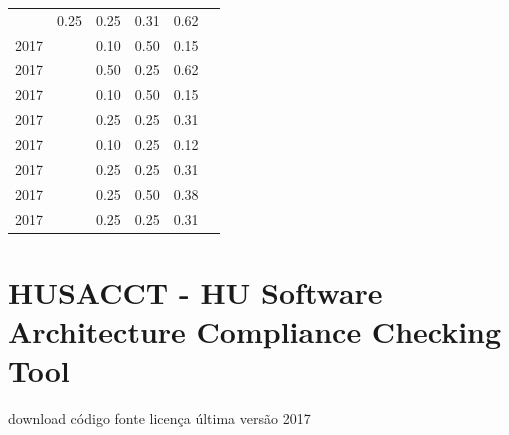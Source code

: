 \begin{table}[H]
\begin{tabular}{| l | c | c | c | c | c |}
          &
          0.25
          &
          0.25
          &
          0.31
          &
            {\color{blue} 0.62}
          \\
            2017
          &
          
          &
          0.10
          &
          0.50
          &
          0.15
          &
          \\
            2017
          &
          
          &
          0.50
          &
          0.25
          &
          0.62
          &
          \\
            2017
          &
          
          &
          0.10
          &
          0.50
          &
          0.15
          &
          \\
            2017
          &
          
          &
          0.25
          &
          0.25
          &
          0.31
          &
          \\
            2017
          &
          
          &
          0.10
          &
          0.25
          &
          0.12
          &
          \\
            2017
          &
          
          &
          0.25
          &
          0.25
          &
          0.31
          &
          \\
            2017
          &
          
          &
          0.25
          &
          0.50
          &
          0.38
          &
          \\
            2017
          &
          
          &
          0.25
          &
          0.25
          &
          0.31
          &
          \\
\hline
\end{tabular}
\end{table}



\section{HUSACCT - HU Software Architecture Compliance Checking Tool}
\checkmark download
\checkmark código fonte
\checkmark licença
\checkmark última versão 2017


